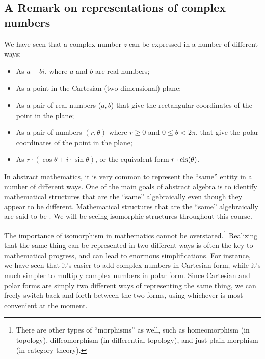 \subsection{A Remark on representations of complex numbers}\label{remRepComplex}

We have seen that a complex number \emph{z} can be expressed in a
number of different ways: 
\begin{itemize}
\item As $a+bi$, where $a$ and $b$ are real numbers; 
\item As a point in the Cartesian (two-dimensional) plane; 
\item As a pair of real numbers ($a,b$) that give the rectangular coordinates
of the point in the plane; 
\item As a pair of numbers $(r,\theta)$ where $r\geq0$ and $0\le\theta<2\pi$,
that give the polar coordinates of the point in the plane; 
\item As $r\cdot(\cos\theta+i\cdot\sin\theta)$, or the equivalent form
$r\cdot\operatorname{cis}(\theta)$.
\end{itemize}
In abstract mathematics, it is very common to represent the ``same''
entity in a number of different ways. One of the main goals of abstract
algebra is to identify mathematical structures that are the ``same''
algebraically even though they appear to be different. Mathematical
structures that are the ``same'' algebraically are said to be
. We will be seeing isomorphic structures
throughout this course.

The importance of isomorphism in mathematics cannot be overstated.\footnote{There are other types of ``morphisms'' as well, such as homeomorphism (in topology), diffeomorphism (in differential topology), and just plain morphism (in category theory).}  Realizing that the same thing can be represented in two different ways is often the key to mathematical progress, and can lead to enormous simplifications. For instance, we have seen that it's  easier to add complex numbers in Cartesian form, while it's much simpler to multiply complex numbers in polar form.  Since Cartesian and polar forms  are simply two different ways of representing the same thing, we can freely switch back and forth between the two forms, using whichever is most convenient at the moment. 

